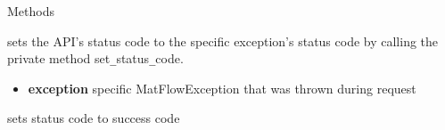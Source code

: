 \begin{methodenv}{Methods}

sets the API's status code to the specific exception's status code by calling the private method
set\texttt{\_}status\texttt{\_}code.
\begin{itemize}
        \item \textbf{exception}
        specific MatFlowException that was thrown during request
\end{itemize}

sets status code to success code

\end{methodenv}

